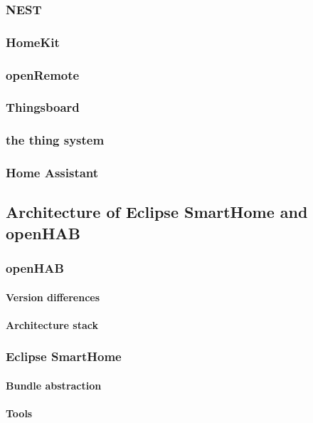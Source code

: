 \documentclass[12pt]{article}
\begin{document}
\subsubsection{NEST}
\subsubsection{HomeKit}
\subsubsection{openRemote}
\subsubsection{Thingsboard}
\subsubsection{the thing system}
\subsubsection{Home Assistant}

\subsection{Architecture of Eclipse SmartHome and openHAB}

\subsubsection{openHAB}
\paragraph{Version differences}
\paragraph{Architecture stack}

\subsubsection{Eclipse SmartHome}
\paragraph{Bundle abstraction}
\paragraph{Tools}
\end{document}
